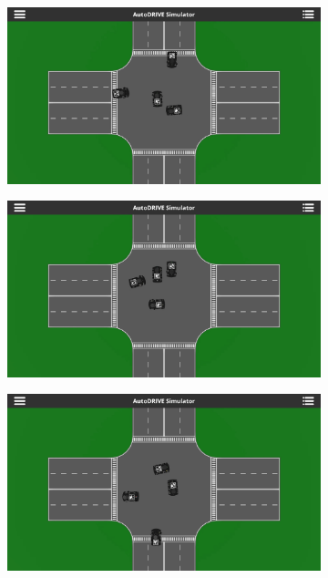\documentclass[letterpaper, 10 pt, conference]{ieeeconf}  %
\begin{document}
\begin{figure}[t]
\begin{subfigure}[b]{0.16\linewidth}
         \caption{}
         \label{fig6c}
     \end{subfigure}
     \hfill
     \begin{subfigure}[b]{0.16\linewidth}
         \centering
         \includegraphics[width=\linewidth]{Fig6d.png}
         \caption{}
         \label{fig6d}
     \end{subfigure}
     \hfill
     \begin{subfigure}[b]{0.16\linewidth}
         \centering
         \includegraphics[width=\linewidth]{Fig6e.png}
         \caption{}
         \label{fig6e}
     \end{subfigure}
     \hfill
     \begin{subfigure}[b]{0.16\linewidth}
         \centering
         \includegraphics[width=\linewidth]{Fig6f.png}

\end{subfigure}
\end{figure}
\end{document}
